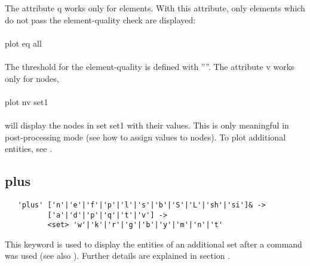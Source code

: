 \documentclass{article}
\begin{document}
The attribute q works only for elements. With this attribute, only elements which do not pass the element-quality check are displayed:\\\\
plot eq all\\\\ The threshold for the element-quality is defined with ''''. The attribute v works only for nodes,\\\\
plot nv set1\\\\will display the nodes in set set1 with their values. This is only meaningful in post-processing mode (see  how to assign values to nodes). To plot additional entities, see .

\subsection{\label{plus}plus}
\begin{verbatim}
   'plus' ['n'|'e'|'f'|'p'|'l'|'s'|'b'|'S'|'L'|'sh'|'si']& ->
          ['a'|'d'|'p'|'q'|'t'|'v'] ->
          <set> 'w'|'k'|'r'|'g'|'b'|'y'|'m'|'n'|'t' 
\end{verbatim}
This keyword is used to display the entities of an additional set after a  command was used (see also ). Further details are explained in section .
\end{document}
